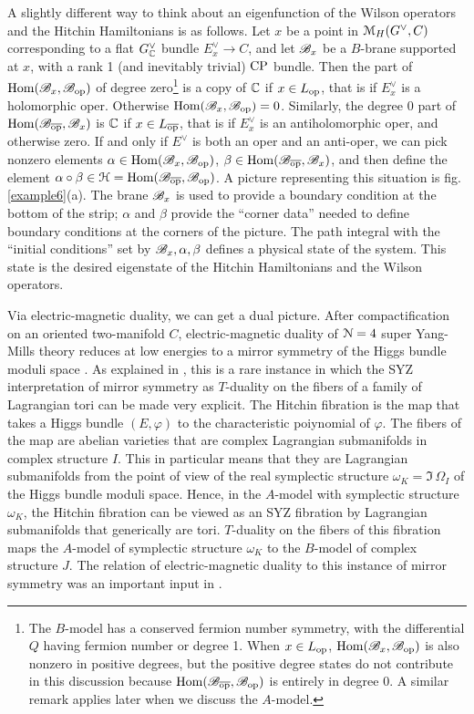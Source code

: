 \documentclass[11pt,a4paper]{article}
\begin{document}
A slightly different way to think about an eigenfunction of the Wilson operators and the Hitchin Hamiltonians is as follows.  Let $x$ be a point in
${\mathcal M}_H(G^\vee,C)$ corresponding to a flat $G^\vee_{\mathbb C}$ bundle $E^\vee_x\to C$,
and let ${\mathscr B}_x$ be a $B$-brane supported at $x$, with a rank 1 (and inevitably trivial) ${\mathrm{CP}}$ bundle.   Then the part of ${\mathrm{Hom}}({\mathscr B}_x,{\mathscr B}_{\mathrm{op}})$ of degree  zero\footnote{The $B$-model has a conserved fermion number symmetry, with the differential $Q$ having fermion number or degree 1. When $x\in L_{\mathrm{op}}$,
${\mathrm{Hom}}({\mathscr B}_x,{\mathscr B}_{\mathrm{op}})$ is also nonzero in positive degrees, but the positive degree states do not contribute in this discussion because ${\mathrm{Hom}}({\mathscr B}_{\overline{\mathrm{op}}},{\mathscr B}_{\mathrm{op}})$ is
entirely in degree 0.   A similar remark applies later when we discuss the $A$-model.}
is a copy of ${\mathbb C}$ if $x\in L_{\mathrm{op}}$, that is if $E^\vee_x$  is a holomorphic oper.   Otherwise ${\mathrm{Hom}}({\mathscr B}_x,{\mathscr B}_{\mathrm{op}})=0$.
Similarly, the degree 0 part of ${\mathrm{Hom}}({\mathscr B}_{\overline{\mathrm{op}}},{\mathscr B}_x)$ is ${\mathbb C}$ if $x\in L_{\overline{\mathrm{op}}}$, that is if $E^\vee_x$  is an antiholomorphic oper, and otherwise zero.   If and only
if $E^\vee$ is both an oper and an anti-oper, we can pick nonzero elements $\alpha\in {\mathrm{Hom}}({\mathscr B}_x,{\mathscr B}_{\mathrm{op}})$, $\beta\in {\mathrm{Hom}}({\mathscr B}_{\overline{\mathrm{op}}},{\mathscr B}_x)$,
and then define the element $\alpha\circ\beta \in {\mathcal H}={\mathrm{Hom}}({\mathscr B}_{\overline{\mathrm{op}}},{\mathscr B}_{\mathrm{op}})$.   A picture representing this situation is fig. \ref{example6}(a). 
The brane ${\mathscr B}_x$ is used to provide a boundary condition at the bottom of the strip; $\alpha$ and $\beta$ provide the ``corner data'' needed to
define boundary conditions at the corners of the picture.   The path integral with the ``initial conditions'' set by ${\mathscr B}_x,\alpha,\beta$ defines a physical state of the system.
This state is the desired eigenstate of the Hitchin Hamiltonians and the Wilson operators.

Via electric-magnetic duality, we can get a dual picture.    After compactification on an oriented two-manifold $C$, electric-magnetic duality of
${\mathcal N}=4$ super Yang-Mills theory reduces at low energies to a mirror symmetry of the Higgs bundle moduli space \cite{BJSV,JWS}.  As explained in
\cite{HT}, this is a rare instance in which the SYZ interpretation \cite{SYZ} of mirror symmetry as $T$-duality on the fibers of a family of Lagrangian tori can
be made very explicit.   The Hitchin fibration is the map that takes a Higgs bundle $(E,\varphi)$ to the characteristic poiynomial of $\varphi$.
The fibers of the map are abelian varieties that are
complex Lagrangian submanifolds in complex structure $I$.  This in particular means that they are Lagrangian submanifolds
from the point of view of the real symplectic structure $\omega_K=\Im\,\Omega_I$ of the Higgs bundle moduli space.   Hence, in the $A$-model
with symplectic structure $\omega_K$, the Hitchin fibration can be viewed as an SYZ fibration by Lagrangian submanifolds that generically are tori.
$T$-duality on the fibers of this fibration maps the $A$-model of symplectic structure $\omega_K$ to the $B$-model of complex structure $J$.   
The relation of electric-magnetic duality to this instance of mirror symmetry was an important input in \cite{KW}.   
\end{document}

